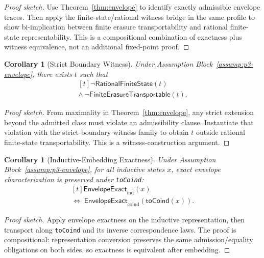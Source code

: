 \documentclass[a4paper,10pt,twocolumn,english]{article}
\numberwithin{equation}{section}
\theoremstyle{paperdef}
\theoremstyle{paperplain}
\newtheorem{corollary}[definition]{Corollary}
\theoremstyle{paperdef}
\theoremstyle{paperremark}
\theoremstyle{paperdef}
\newcommand{\EnvelopeExact}{\ensuremath{\mathsf{EnvelopeExact}}}
\begin{document}
\begin{proof}[Proof sketch]
	Use Theorem~\ref{thm:envelope} to identify exactly admissible envelope traces.
	Then apply the finite-state/rational witness bridge in the same profile to show
	bi-implication between finite erasure transportability and rational finite-state
	representability. This is a compositional combination of exactness plus witness
	equivalence, not an additional fixed-point proof.
\end{proof}

\begin{corollary}[Strict Boundary Witness]
	\label{cor:boundary}
	Under Assumption Block~\ref{assump:p3-envelope}, there exists $t$ such that
	\begin{equation}
		\begin{aligned}[t]
			\neg \mathsf{RationalFiniteState}(t)
			\\
			\land\ \neg \mathsf{FiniteErasureTransportable}(t).
		\end{aligned}
	\end{equation}
\end{corollary}

\begin{proof}[Proof sketch]
	From maximality in Theorem~\ref{thm:envelope}, any strict extension beyond the
	admitted class must violate an admissibility clause. Instantiate that violation
	with the strict-boundary witness family to obtain $t$ outside rational finite-state
	transportability. This is a witness-construction argument.
\end{proof}

\begin{corollary}[Inductive-Embedding Exactness]
	\label{cor:embedding}
	Under Assumption Block~\ref{assump:p3-envelope}, for all inductive states $x$, exact envelope characterization is preserved under \texttt{toCoind}:
	\begin{equation}
		\begin{aligned}[t]
			\EnvelopeExact_{\mathrm{ind}}(x)
			\\
			\iff\ \EnvelopeExact_{\mathrm{coind}}(\mathsf{toCoind}(x)).
		\end{aligned}
	\end{equation}
\end{corollary}

\begin{proof}[Proof sketch]
	Apply envelope exactness on the inductive representation, then transport along
	\texttt{toCoind} and its inverse correspondence laws. The proof is compositional:
	representation conversion preserves the same admission/equality obligations on
	both sides, so exactness is equivalent after embedding.
\end{proof}
\end{document}
